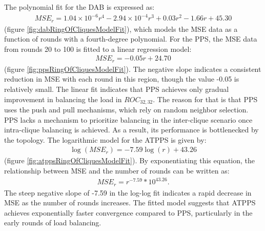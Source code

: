 The polynomial fit for the DAB is expressed as:
\begin{align}
    MSE_r=1.04\times 10^{-6}r^{4}-2.94\times 10^{-4}r^{3}+0.03r^{2}-1.66r+45.30    
\end{align}
(figure \ref{fig:dabRingOfCliquesModelFit}), which models the MSE data as a function of rounds with a fourth-degree polynomial. For the PPS, the MSE data from rounds 20 to 100 is fitted to a linear regression model:
\begin{align}
    MSE_r=-0.05r+24.70
\end{align}
(figure \ref{fig:ppsRingOfCliquesModelFit}). The negative slope indicates a consistent reduction in MSE with each round in this region, though the value -0.05 is relatively small. The linear fit indicates that PPS achieves only gradual improvement in balancing the load in $ROC_{32,32}$. The reason for that is that PPS uses the push and pull mechanisms, which rely on random neighbor selection. PPS lacks a mechanism to prioritize balancing in the inter-clique scenario once intra-clique balancing is achieved. As a result, its performance is bottlenecked by the topology. The logarithmic model for the ATPPS is given by: 
\begin{align}
    \log{(MSE_r)}=-7.59\log{(r)}+43.26   
\end{align}
(figure \ref{fig:atppsRingOfCliquesModelFit}). By exponentiating this equation, the relationship between MSE and the number of rounds can be written as:
\begin{align}
    MSE_r=r^{-7.59}*10^{43.26}.    
\end{align}
The steep negative slope of -7.59 in the log-log fit indicates a rapid decrease in MSE as the number of rounds increases. The fitted model suggests that ATPPS achieves exponentially faster convergence compared to PPS, particularly in the early rounds of load balancing.

